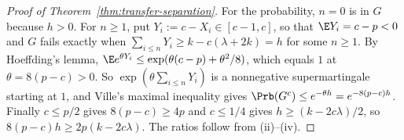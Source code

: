 \begin{proof}[Proof of Theorem~\ref{thm:transfer-separation}]
For the probability, $n=0$ is in $G$ because $h>0$. For $n\ge1$, put
$Y_i:=c-X_i\in[c-1,c]$, so that $\E Y_i=c-p<0$ and $G$ fails exactly when
$\sum_{i\le n}Y_i\ge k-c(\lambda+2k)=h$ for some $n\ge1$. By Hoeffding's lemma,
$\E e^{\theta Y_i}\le\exp(\theta(c-p)+\theta^2/8)$, which equals $1$ at
$\theta=8(p-c)>0$. So $\exp(\theta\sum_{i\le n}Y_i)$ is a nonnegative
supermartingale starting at $1$, and Ville's maximal inequality gives
$\Prb(G^c)\le e^{-\theta h}=e^{-8(p-c)h}$. Finally $c\le p/2$ gives
$8(p-c)\ge4p$ and $c\le1/4$ gives $h\ge(k-2c\lambda)/2$, so
$8(p-c)h\ge2p(k-2c\lambda)$. The ratios follow from (ii)--(iv).
\end{proof}
